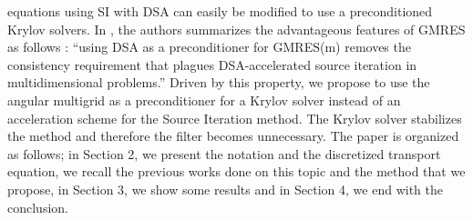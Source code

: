 equations using SI with DSA can easily be modified to use a preconditioned Krylov
solvers. In \cite{ttg}, the authors summarizes the advantageous
features of GMRES as follows : ``using DSA as a preconditioner
for GMRES(m) removes the consistency requirement that plagues DSA-accelerated
source iteration in multidimensional problems.'' Driven by this
property, we propose to use the angular multigrid as a preconditioner for a 
Krylov solver instead of an acceleration scheme for the Source Iteration
method. The Krylov solver stabilizes the method and therefore the filter becomes
unnecessary. The paper is organized as follows; in Section 2, we present the
notation and the discretized transport equation,  we recall the
previous works done on this topic and the method that we propose, in Section
3, we show some results and in Section 4, we end with the conclusion.

